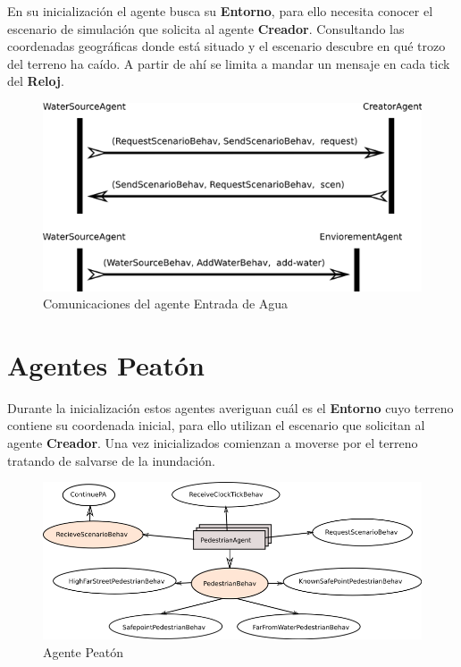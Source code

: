 En su inicialización el agente busca su {\bf Entorno}, para ello necesita
conocer el escenario de simulación que solicita al agente {\bf Creador}.
Consultando las coordenadas geográficas donde está situado y el escenario
descubre en qué trozo del terreno ha caído. A partir de ahí se limita a mandar
un mensaje en cada tick del {\bf Reloj}.

\begin{figure}[H]
 \centering
 \includegraphics[width=120mm]{figuras/cap5/com_water_source.png}
 \caption{Comunicaciones del agente Entrada de Agua}
\end{figure}

\section*{Agentes Peatón}

Durante la inicialización estos agentes averiguan cuál es el {\bf Entorno} cuyo
terreno contiene su coordenada inicial, para ello utilizan el escenario que
solicitan al agente {\bf Creador}. Una vez inicializados comienzan a moverse
por el terreno tratando de salvarse de la inundación.

\begin{figure}[H]
 \centering
 \includegraphics[width=135mm]{figuras/cap5/ag_pedestrian.png}
 \caption{Agente Peatón}
\end{figure}

